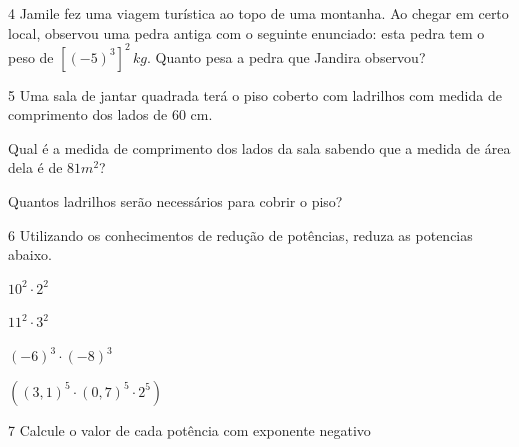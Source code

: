 \num{4} Jamile fez uma viagem turística ao topo de uma montanha. Ao chegar em
certo local, observou uma pedra antiga com o seguinte enunciado: esta
pedra tem o peso de $[(-5)^3]^2\,kg$. Quanto pesa a pedra que Jandira
observou?




\num{5} Uma sala de jantar quadrada terá o piso coberto com ladrilhos com
medida de comprimento dos lados de 60 cm.


\begin{escolha}
\item Qual é a medida de comprimento dos lados da sala sabendo que a medida
de área dela é de $81 m^2$?
\item Quantos ladrilhos serão necessários para cobrir o piso?
\end{escolha}


\num{6} Utilizando os conhecimentos de redução de potências, reduza as
potencias abaixo.

\begin{escolha}
\item $10^2 \cdot 2^2$  
\item $11^2 \cdot 3^2$  
\item $(-6)^3 \cdot (-8)^3$  
\item $((3,1)^5 \cdot (0,7)^5 \cdot 2^5)$  
\end{escolha}





\num{7} Calcule o valor de cada potência com exponente negativo


